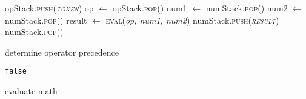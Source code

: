 \documentclass{article}
\begin{document}
\begin{algorithm}
\begin{algorithmic}[1]
                                        \State opStack.\textsc{push(\textit{token})}
                                \EndIf
                        \EndWhile
                                \State op $ \gets $ opStack.\textsc{pop}()
                                \State num1 $ \gets $ numStack.\textsc{pop}()
                                \State num2 $ \gets $ numStack.\textsc{pop}()
                                \State result $ \gets $ \textsc{eval}(\textit{op, num1, num2})
                                \State numStack.\textsc{push(\textit{result})}
                        \EndWhile
                        \State \Return numStack.\textsc{pop()}
                        \EndFunction
                \end{algorithmic}
        \end{algorithm}
    
    \begin{algorithm}
    	\caption{determine operator precedence}
    	\label{opPrec}
    	\begin{algorithmic}[1]
    				\State \Return \texttt{false}
    			\EndIf
    		\EndFunction
    	\end{algorithmic}
    \end{algorithm}
    
    \begin{algorithm}
    	\caption{evaluate math}
    	\label{eval}
    	\begin{algorithmic}[1]
    			\If {}
    			\ElsIf {}
    			\EndIf
    		\EndFunction
    	\end{algorithmic}
    \end{algorithm}
\end{document}
